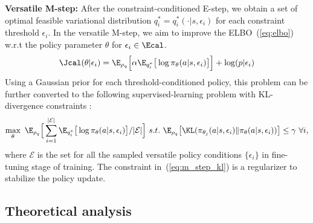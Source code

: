 \textbf{Versatile M-step: }After the constraint-conditioned E-step, we obtain a set of optimal feasible variational distribution $q^*_i=q^*_i(\cdot|s, \epsilon_i)$ for each constraint threshold $\epsilon_i$. In the versatile M-step, we aim to improve the ELBO~(\ref{eq:elbo}) w.r.t the policy parameter $\theta$ for $\epsilon_i \in \Ecal$.
\begin{equation}
\begin{split}
    {\Jcal}(\theta|\epsilon_i) = \E_{\rho_q}\Big[\alpha \E_{q^*_i} \big[ \log \pi_\theta (a|s, \epsilon_i)\big]\Big] + \log (p|\epsilon_i)
\end{split}
\label{eq:mstep}
\end{equation}
Using a Gaussian prior for each threshold-conditioned policy, 
this problem can be further converted to the following supervised-learning problem with KL-divergence constraints \cite{abdolmaleki2018maximum, abdolmaleki2018relative}: 
\vspace{-5pt}
\begin{equation}
\begin{split}
    \max_\theta \ \E_{\rho_q}\Big[\sum_{i=1}^{|{\mathcal{E}}|} \E_{q^*_i} \big[ \log \pi_\theta (a|s,\epsilon_i)\big] / |{\mathcal{E}}| \Big] \  s.t. \ \E_{\rho_q}\big[ \KL(\pi_{\theta_j}(a|s, \epsilon_i)\Vert \pi_{\theta}(a|s, \epsilon_i)) \big] \leq \gamma \ \forall i,
\end{split}
\label{eq:m_step_kl}
\end{equation}
where $\mathcal{E}$ is the set for all the sampled versatile policy conditions $\{\epsilon_i\}$ in fine-tuning stage of training. The constraint in~(\ref{eq:m_step_kl}) is a regularizer to stabilize the policy update. 
\subsection{Theoretical analysis}

